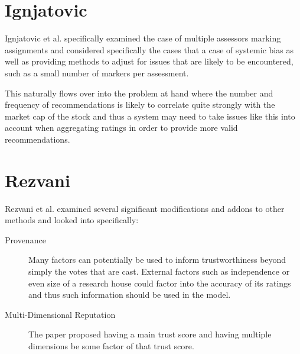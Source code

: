\section{Ignjatovic}
Ignjatovic et al. specifically examined the case of multiple assessors marking assignments and considered specifically the cases that a case of systemic bias as well as providing methods to adjust for issues that are likely to be encountered, such as a small number of markers per assessment.

This naturally flows over into the problem at hand where the number and frequency of recommendations is likely to correlate quite strongly with the market cap of the stock and thus a system may need to take issues like this into account when aggregating ratings in order to provide more valid recommendations.

\section{Rezvani}
Rezvani et al. examined several significant modifications and addons to other methods and looked into specifically:
\begin{description}
    \item[Provenance] Many factors can potentially be used to inform trustworthiness beyond simply the votes that are cast. External factors such as independence or even size of a research house could factor into the accuracy of its ratings and thus such information should be used in the model.
    \item[Multi-Dimensional Reputation] The paper proposed having a main trust 
    score and having multiple dimensions be some factor of that trust score.
\end{description}